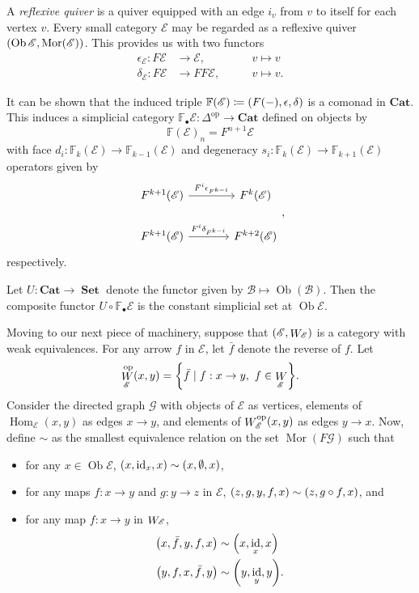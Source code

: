 \documentclass[10pt,letterpaper,cm]{nupset}
\theoremstyle{definition}
\theoremstyle{theorem}
\theoremstyle{remark}
\DeclareMathOperator{\ob}{Ob}
\DeclareMathOperator{\mor}{Mor}
\newcommand{\0}{\mathbf{0}}
\newcommand{\1}{\mathbf{1}}
\newcommand{\2}{\mathbf{2}}
\DeclareMathOperator{\op}{op}
\DeclareMathOperator{\set}{\mathbf{Set}}
\newcommand{\e}{\mathscr{E}}
\DeclareMathOperator{\Hom}{Hom}
\DeclareMathOperator{\idd}{id}
\DeclareMathOperator{\we}{\mathnormal{W}}
\newcommand{\bi}{\begin{itemize}}
\newcommand{\ei}{\end{itemize}}
\begin{document}
\smallskip

A \textit{reflexive quiver} is a quiver equipped with an edge $i_v$ from $v$ to itself for each vertex $v$. Every small category $\e$ may be regarded as a reflexive quiver $\mleft(\ob{\e}, \mor(\e)\mright)$. This provides us with two functors
\begin{alignat*}
\epsilon_{\e} : F{\e} &\longrightarrow \e , &&\  \quad v \mapsto v
\\ \delta_{\e}: F{\e} &\longrightarrow F{F{\e}}, &&\  \quad v \mapsto v.
\end{alignat*} 

It can be shown that the induced  triple $\mathbb{F}(\e)\coloneqq \mleft(F({-}), \epsilon, \delta\mright)$ is a comonad in $\mathbf{Cat}$. This induces a simplicial category $\mathbb{F}_{\bullet}{\e} : \varDelta^{\op} \to \mathbf{Cat}$ defined on objects by
\[
\mathbb{F}(\e)_n = F^{n+1}{\e}
\]
with face $d_i : \mathbb{F}_k(\e) \to  \mathbb{F}_{k-1}(\e)$ and degeneracy $s_i :  \mathbb{F}_k(\e) \to  \mathbb{F}_{k+1}(\e)$ operators given by
\[
\begin{tikzcd}[column sep=large]
F^{k+1}(\e) \arrow[r, "F^i\epsilon_{F^{k-i}}"] & F^k(\e)     \\
F^{k+1}(\e) \arrow[r, "F^i\delta_{F^{k-i}}"]   & F^{k+2}(\e)
\end{tikzcd}
,\]
respectively.

\medskip

Let $U: \mathbf{Cat} \to \set$ denote the functor given by  $\mathscr{B} \mapsto \ob(\mathscr{B})$. Then the composite functor $U \circ \mathbb{F}_{\bullet}{\e}$ is the constant simplicial set at $\ob{\e}$.

\medskip

Moving to our next piece of machinery, suppose that $\mleft(\e, \we_{\e}\mright)$ is a category with weak equivalences. For any arrow $f$ in $\e$, let $\bar{f}$ denote the reverse of $f$. Let $$\we_{\e}^{\op}(x,y) = \mleft\{\bar{f} \mid f : x\to y, \ f \in \we_{\e}\mright\}.$$ Consider the directed graph $\mathcal{G}$ with objects of $\e$ as vertices, elements of  $\Hom_{\e}(x,y)$ as edges $x \to y$, and elements of $\we_{\e}^{\op}(x,y)$ as edges $y\to x$. Now, define $\sim$ as the smallest equivalence relation on the set $\mor(F{\mathcal{G}})$ such that

\bi
\item for any $x\in \ob{\e}$, $\mleft(x,\idd_x, x\mright) \sim \mleft(x, \emptyset, x\mright)$,
\item for any maps $f: x\to y$ and $g: y \to z$ in $\e$, $\mleft(z,g,y,f,x\mright)\sim \mleft(z,g\circ f,x\mright)$, and 
\item for any map $f: x\to y$ in $\we_{\e}$, 
\begin{align*}
\mleft(x ,\bar{f} , y,  f, x\mright) &\sim \mleft(x, \idd_x, x \mright)
\\  \mleft(y ,f , x,  \bar{f}, y\mright) &\sim \mleft(y, \idd_y, y \mright).
\end{align*}
\ei
\end{document}
